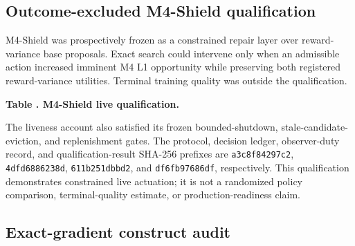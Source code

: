 \documentclass{article}
\begin{document}
\subsection{Outcome-excluded M4-Shield qualification}

M4-Shield was prospectively frozen as a constrained repair layer over reward-variance base proposals. Exact search could intervene only when an admissible action increased imminent M4 L1 opportunity while preserving both registered reward-variance utilities. Terminal training quality was outside the qualification.

\begin{center}
\begin{minipage}{\columnwidth}
\centering
{}\textbf{Table \thetable. M4-Shield live qualification.}\\[2pt]
\small
{}
\end{minipage}
\end{center}

The liveness account also satisfied its frozen bounded-shutdown,
stale-candidate-eviction, and replenishment gates. The protocol, decision
ledger, observer-duty record, and qualification-result SHA-256 prefixes are
\texttt{a3c8f84297c2}, \texttt{4dfd6886238d},
\texttt{611b251dbbd2}, and \texttt{df6fb97686df}, respectively. This
qualification demonstrates constrained live actuation; it is not a randomized
policy comparison, terminal-quality estimate, or production-readiness claim.

\subsection{Exact-gradient construct audit}
\end{document}
